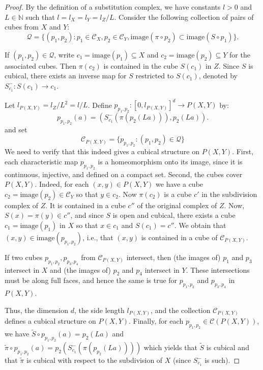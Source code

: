 \documentclass{amsart}
\theoremstyle{plain}
\theoremstyle{definition}
\numberwithin{equation}{section}
\numberwithin{theorem}{section}
\newcommand{\cC}{\mathcal{C}}
\begin{document}
\begin{proof} By the definition of a substitution complex, we have constants $l>0$ and $L\in\mathbb{N}$ such that $l=l_{X}=l_Y= l_Z/L$. Consider the following collection of pairs of cubes from $X$ and $Y$:
\[
\mathcal{Q}=\{(p_1,p_2) : p_1 \in \cC_{X}, p_2 \in \cC_{Y}, \text{image}(\pi\circ p_2) \subset \text{image}(S\circ p_1)\}.
\]    


If $(p_1,p_2)\in\mathcal{Q}$, write $c_1=\text{image}(p_1)\subseteq X$ and $c_2=\text{image}(p_2)\subseteq Y$ for the associated cubes. Then $\pi(c_2)$ is contained in the cube $S(c_1)$ in $Z$. Since $S$ is cubical, there exists an inverse map for $S$ restricted to $S(c_1)$, denoted by $S^-_{c_1}:S(c_1)\to c_1.$


Let  $l_{P(X,Y)}=l_Z/L^2 = l/L$. Define $p_{p_1, p_2}:[0,l_{P(X,Y)}]^d \to P(X,Y)$ by:
    \[
    p_{p_1, p_2}(a)=(S^-_{c_1}(\pi(p_{2}(L a))), p_{2}(La)).
    \]
and set
$$ \cC_{P(X,Y)} = \{p_{p_1,p_2}: (p_1,p_2)\in\mathcal{Q}\}$$
We need to verify that this indeed gives a cubical structure on $P(X,Y)$. First, each characteristic  map $p_{p_1,p_2}$ is a homeomorphism onto its image, since it is continuous, injective, and defined on a compact set. Second, the cubes cover $P(X,Y)$. Indeed, for each $(x,y)\in P(X,Y)$ we have a cube $c_2=\text{image}(p_2)\in \cC_Y$ so that $y\in c_2$.  Now $\pi(c_2)$ is a cube $c'$ in the subdivision complex of $Z$. It is contained in a cube $c''$ of the original complex of $Z$. Now, $S(x)=\pi(y)\in c''$, and since $S$ is open and cubical,  there exists a cube $c_1=\text{image}(p_1)$ in $X$ so that $x\in c_1$ and $S(c_1)=c''$. We obtain that $(x,y)\in\text{image}(p_{p_1,p_2})$, i.e., that $(x,y)$ is contained in a cube of $\cC_{P(X,Y)}$. 

If two cubes $p_{p_1,p_2}, p_{p_3,p_4}$ from $\cC_{P(X,Y)}$ intersect, then (the images of) $p_1$ and $p_3$ intersect in $X$ and (the images of) $p_2$ and $p_4$ intersect in $Y$. These intersections must be along full faces, and hence the same is true for $p_{p_1,p_2}$ and $p_{p_3,p_4}$ in $P(X,Y)$. 


Thus, the dimension $d$, the side length $l_{P(X,Y)}$, and the collection $\cC_{P(X,Y)}$ defines a cubical structure on $P(X,Y)$.  Finally, for each $p_{p_1,p_2}\in\cC(P(X,Y))$, we have $\tilde{S} \circ p_{p_1,p_2}(a) = p_2(La)$ and $\tilde{\pi}\circ p_{p_1,p_2}(a) = p_{2}(S^-_{c_1}(\pi(p_{p_2}(L a))))$ which yields that $\tilde{S}$ is cubical and that $\tilde{\pi}$ is cubical with respect to the subdivision of $X$ (since $S^-_{c_1}$ is such).


\end{proof}
\end{document}
